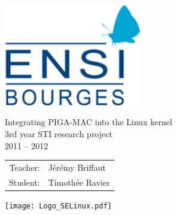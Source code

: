 \documentclass[pdftex,a4paper,titlepage,11pt]{article}
\newcommand\BackgroundPic[1]{
	\put(0,-100){
		\parbox[b][\paperheight]{\paperwidth}{
			\vfill
			\centering
			\texttt{[image: \#1]}
			\vfill
		}
	}
}
\begin{document}
\begin{titlepage}

\AddToShipoutPicture*{\BackgroundPic{Tux_n&b_half.png}}

\begin{center}
	\includegraphics[width=6cm, keepaspectratio=true]{Logo_ENSIB.png}
\end{center}

\vspace{0.5cm}

\begin{center}
	\fontsize{30}{30}\selectfont Integrating PIGA-MAC into the Linux kernel\\
	\vspace{2cm}
	\Huge 3rd year STI research project\\
	\Huge 2011 -- 2012
\end{center}

\vspace{2cm}

\begin{center}
	\begin{tabular}{rl}
		\hspace{7.5cm}
		\huge Teacher: & \huge Jérémy Briffaut\\[4pt]
		\huge Student: & \huge Timothée Ravier
	\end{tabular}
\end{center}

\vspace{0.5cm}

\begin{center}
\hspace{7.5cm}\texttt{[image: Logo\_SELinux.pdf]}
\end{center}

\end{titlepage}

\newpage

~\thispagestyle{fancy}

\newpage

~

\vspace{1cm}
\addtocounter{page}{-1}
\end{document}
